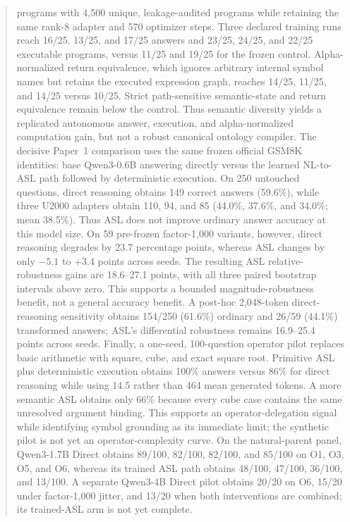 \documentclass[11pt]{article}
\begin{document}
\begin{abstract}
programs with 4,500 unique, leakage-audited programs while retaining the same
rank-8 adapter and 570 optimizer steps. Three declared training runs reach
16/25, 13/25, and 17/25 answers and 23/25, 24/25, and 22/25 executable programs,
versus 11/25 and 19/25 for the frozen control. Alpha-normalized return
equivalence, which ignores arbitrary internal symbol names but retains the
executed expression graph, reaches 14/25, 11/25, and 14/25 versus 10/25. Strict
path-sensitive semantic-state and return equivalence remain below the control.
Thus semantic diversity yields a replicated autonomous answer, execution, and
alpha-normalized computation gain, but not a robust canonical ontology compiler.
The decisive Paper~1 comparison uses the same frozen official GSM8K identities:
base Qwen3-0.6B answering directly versus the learned NL-to-ASL path followed by
deterministic execution. On 250 untouched questions, direct reasoning obtains
149 correct answers (59.6\%), while three U2000 adapters obtain 110, 94, and 85
(44.0\%, 37.6\%, and 34.0\%; mean 38.5\%). Thus ASL does not improve ordinary
answer accuracy at this model size. On 59 pre-frozen factor-1,000 variants,
however, direct reasoning degrades by 23.7 percentage points, whereas ASL changes
by only $-5.1$ to $+3.4$ points across seeds. The resulting ASL relative-robustness
gains are 18.6--27.1 points, with all three paired bootstrap intervals above zero.
This supports a bounded magnitude-robustness benefit, not a general accuracy
benefit. A post-hoc 2,048-token direct-reasoning sensitivity obtains 154/250
(61.6\%) ordinary and 26/59 (44.1\%) transformed answers; ASL's differential
robustness remains 16.9--25.4 points across seeds. Finally, a one-seed,
100-question operator pilot replaces basic arithmetic with square, cube, and
exact square root. Primitive ASL plus deterministic execution obtains 100\%
answers versus 86\% for direct reasoning while using 14.5 rather than 464 mean
generated tokens. A more semantic ASL obtains only 66\% because every cube case
contains the same unresolved argument binding. This supports an
operator-delegation signal while identifying symbol grounding as its immediate
limit; the synthetic pilot is not yet an operator-complexity curve. On the
natural-parent panel, Qwen3-1.7B Direct obtains 89/100, 82/100, 82/100, and
85/100 on O1, O3, O5, and O6, whereas its trained ASL path obtains 48/100,
47/100, 36/100, and 13/100. A separate Qwen3-4B Direct pilot obtains 20/20 on
O6, 15/20 under factor-1,000 jitter, and 13/20 when both interventions are
combined; its trained-ASL arm is not yet complete.
\end{abstract}
\end{document}
